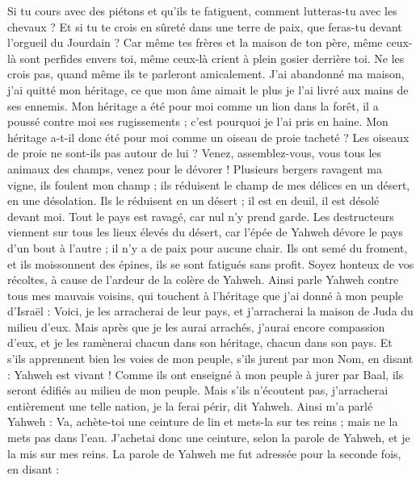 \begin{multicols}{2}
Si tu cours avec des piétons et qu'ils te fatiguent, comment lutteras-tu avec les chevaux ? Et si tu te crois en sûreté dans une terre de paix, que feras-tu devant l'orgueil du Jourdain ?
Car même tes frères et la maison de ton père, même ceux-là sont perfides envers toi, même ceux-là crient à plein gosier derrière toi. Ne les crois pas, quand même ils te parleront amicalement.
J'ai abandonné ma maison, j'ai quitté mon héritage, ce que mon âme aimait le plus je l'ai livré aux mains de ses ennemis.
Mon héritage a été pour moi comme un lion dans la forêt, il a poussé contre moi ses rugissements ; c'est pourquoi je l'ai pris en haine.
Mon héritage a-t-il donc été pour moi comme un oiseau de proie tacheté ? Les oiseaux de proie ne sont-ils pas autour de lui ? Venez, assemblez-vous, vous tous les animaux des champs, venez pour le dévorer !
Plusieurs bergers ravagent ma vigne, ils foulent mon champ ; ils réduisent le champ de mes délices en un désert, en une désolation.
Ils le réduisent en un désert ; il est en deuil, il est désolé devant moi. Tout le pays est ravagé, car nul n'y prend garde.
Les destructeurs viennent sur tous les lieux élevés du désert, car l'épée de Yahweh dévore le pays d'un bout à l'autre ; il n'y a de paix pour aucune chair.
Ils ont semé du froment, et ils moissonnent des épines, ils se sont fatigués sans profit. Soyez honteux de vos récoltes, à cause de l'ardeur de la colère de Yahweh.
Ainsi parle Yahweh contre tous mes mauvais voisins, qui touchent à l'héritage que j'ai donné à mon peuple d'Israël : Voici, je les arracherai de leur pays, et j'arracherai la maison de Juda du milieu d'eux.
Mais après que je les aurai arrachés, j'aurai encore compassion d'eux, et je les ramènerai chacun dans son héritage, chacun dans son pays.
Et s'ils apprennent bien les voies de mon peuple, s'ils jurent par mon Nom, en disant : Yahweh est vivant ! Comme ils ont enseigné à mon peuple à jurer par Baal, ils seront édifiés au milieu de mon peuple.
Mais s'ils n'écoutent pas, j'arracherai entièrement une telle nation, je la ferai périr, dit Yahweh.
\VerseOne{}Ainsi m'a parlé Yahweh : Va, achète-toi une ceinture de lin et mets-la sur tes reins ; mais ne la mets pas dans l'eau.
J'achetai donc une ceinture, selon la parole de Yahweh, et je la mis sur mes reins.
La parole de Yahweh me fut adressée pour la seconde fois, en disant :

\end{multicols}
